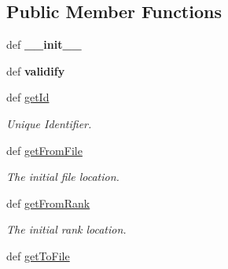 \subsection*{Public Member Functions}
\begin{DoxyCompactItemize}
\item 
\hypertarget{classGameObject_1_1Move_a28c1b754287122156ba6cadd330cfc7a}{
def {\bfseries \_\-\_\-init\_\-\_\-}}
\label{classGameObject_1_1Move_a28c1b754287122156ba6cadd330cfc7a}

\item 
\hypertarget{classGameObject_1_1Move_aecb61e2c300b06205b74d47d3e1faa8e}{
def {\bfseries validify}}
\label{classGameObject_1_1Move_aecb61e2c300b06205b74d47d3e1faa8e}

\item 
\hypertarget{classGameObject_1_1Move_adde9eb54c013b37df51bdde531827ecb}{
def \hyperlink{classGameObject_1_1Move_adde9eb54c013b37df51bdde531827ecb}{getId}}
\label{classGameObject_1_1Move_adde9eb54c013b37df51bdde531827ecb}

\begin{DoxyCompactList}\small\item\em Unique Identifier. \item\end{DoxyCompactList}\item 
\hypertarget{classGameObject_1_1Move_a58418b0ccdb8c6e5bddc27332895802f}{
def \hyperlink{classGameObject_1_1Move_a58418b0ccdb8c6e5bddc27332895802f}{getFromFile}}
\label{classGameObject_1_1Move_a58418b0ccdb8c6e5bddc27332895802f}

\begin{DoxyCompactList}\small\item\em The initial file location. \item\end{DoxyCompactList}\item 
\hypertarget{classGameObject_1_1Move_a492534bd34612e25043c70df14722826}{
def \hyperlink{classGameObject_1_1Move_a492534bd34612e25043c70df14722826}{getFromRank}}
\label{classGameObject_1_1Move_a492534bd34612e25043c70df14722826}

\begin{DoxyCompactList}\small\item\em The initial rank location. \item\end{DoxyCompactList}\item 
\hypertarget{classGameObject_1_1Move_a20f7d1d252fb96aa80c356f44badf880}{
def \hyperlink{classGameObject_1_1Move_a20f7d1d252fb96aa80c356f44badf880}{getToFile}}
\label{classGameObject_1_1Move_a20f7d1d252fb96aa80c356f44badf880}


\end{DoxyCompactItemize}

